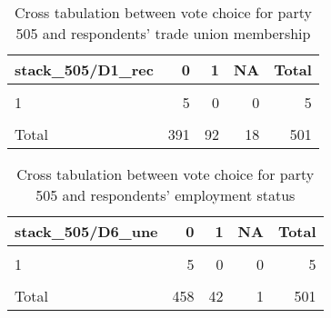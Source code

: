 \documentclass[
]{article}
\begin{document}
\begin{table}

\caption{\label{tab:unnamed-chunk-43}Cross tabulation between vote choice for party 505 and respondents' trade union 
                   membership \label{table:crosstab_5_cy}}
\centering
\begin{tabular}[t]{l|r|r|r|r}
\hline
stack\_505/D1\_rec & 0 & 1 & NA & Total\\
\hline
\cellcolor{gray!6}{0} & \cellcolor{gray!6}{339} & \cellcolor{gray!6}{84} & \cellcolor{gray!6}{15} & \cellcolor{gray!6}{438}\\
\hline
1 & 5 & 0 & 0 & 5\\
\hline
\cellcolor{gray!6}{NA} & \cellcolor{gray!6}{47} & \cellcolor{gray!6}{8} & \cellcolor{gray!6}{3} & \cellcolor{gray!6}{58}\\
\hline
Total & 391 & 92 & 18 & 501\\
\hline
\end{tabular}
\end{table}

\begin{table}

\caption{\label{tab:unnamed-chunk-43}Cross tabulation between vote choice for party 505 and respondents' employment status 
                  \label{table:crosstab_6_cy}}
\centering
\begin{tabular}[t]{l|r|r|r|r}
\hline
stack\_505/D6\_une & 0 & 1 & NA & Total\\
\hline
\cellcolor{gray!6}{0} & \cellcolor{gray!6}{398} & \cellcolor{gray!6}{39} & \cellcolor{gray!6}{1} & \cellcolor{gray!6}{438}\\
\hline
1 & 5 & 0 & 0 & 5\\
\hline
\cellcolor{gray!6}{NA} & \cellcolor{gray!6}{55} & \cellcolor{gray!6}{3} & \cellcolor{gray!6}{0} & \cellcolor{gray!6}{58}\\
\hline
Total & 458 & 42 & 1 & 501\\
\hline
\end{tabular}
\end{table}
\end{document}
